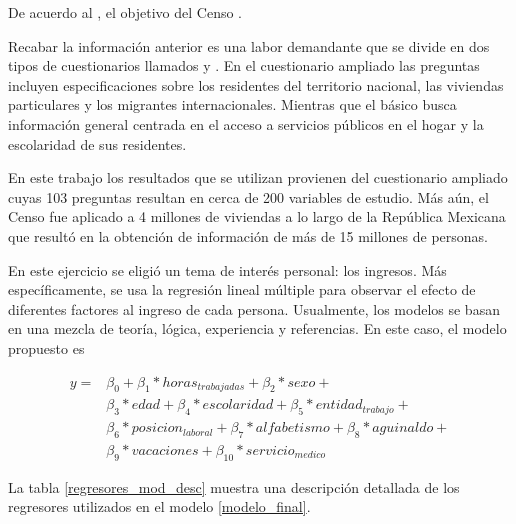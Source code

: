 De acuerdo al \cite{censo_ref}, el objetivo del Censo .

Recabar la información anterior es una labor demandante que se divide en dos tipos de cuestionarios llamados  y . En el cuestionario ampliado las preguntas incluyen especificaciones sobre los residentes del territorio nacional, las viviendas particulares y los migrantes internacionales. Mientras que el básico busca información general centrada en el acceso a servicios públicos en el hogar y la escolaridad de sus residentes. 

En este trabajo los resultados que se utilizan provienen del cuestionario ampliado cuyas 103 preguntas resultan en cerca de 200 variables de estudio. Más aún, el Censo fue aplicado a 4 millones de viviendas a lo largo de la República Mexicana que resultó en la obtención de información de más de 15 millones de personas.

En este ejercicio se eligió un tema de interés personal: los ingresos. Más específicamente, se usa la regresión lineal múltiple para observar el efecto de diferentes factores al ingreso de cada persona. Usualmente, los modelos se basan en una mezcla de teoría, lógica, experiencia y referencias. En este caso, el modelo propuesto es 


\begin{equation} \label{modelo_final}
    \begin{aligned}
    	y =& \beta_0 + \beta_1*horas_{trabajadas} + \beta_2*sexo + \\
    	&\beta_3*edad + \beta_4*escolaridad + \beta_5*entidad_{trabajo} + \\ &\beta_6*posicion_{laboral} + \beta_7*alfabetismo + \beta_8*aguinaldo + \\ &\beta_9*vacaciones + \beta_{10}*servicio_{medico}
    \end{aligned}
\end{equation}

La tabla \ref{regresores_mod_desc} muestra una descripción detallada de los regresores utilizados en el modelo \ref{modelo_final}.

